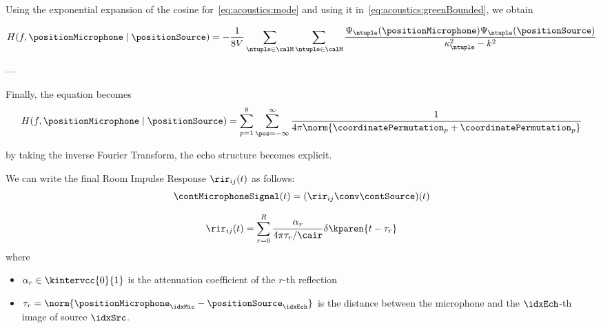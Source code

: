 Using the exponential expansion of the cosine for~\cref{eq:acoustics:mode}
and using it in~\cref{eq:acoustics:greenBounded}, we obtain

\begin{equation}
    H(f, \positionMicrophone \mid \positionSource) =
    - \frac{1}{8 V}
    \sum_{\ntuple \in \calM}
    \sum_{\ntuple \in \calM}
    \frac{\Psi_{\ntuple}(\positionMicrophone)\Psi_{\ntuple}(\positionSource)}{\kappa^2_{\ntuple} - k^2}
\end{equation}%

---

Finally, the equation becomes
\begin{equation}
    \label{eq:acoustics:ims:frourier}
    H(f, \positionMicrophone \mid \positionSource) =
        \sum_{p=1}^{8}
            \sum_{\pos=-\infty}^{\infty}
                \frac{1}{4 \pi \norm{\coordinatePermutation_p +  \coordinatePermutation_p}}
\end{equation}

by taking the inverse Fourier Transform, the echo structure becomes explicit.

We can write the final Room Impulse Response $\rir_{ij}(t)$ as follows:
\begin{equation}
    \contMicrophoneSignal(t) = (\rir_{ij} \conv \contSource)(t)
\end{equation}

\begin{equation}
    \rir_{ij}(t) = \sum_{r=0}^{R} \frac{\alpha_r}{4 \pi \tau_r / \cair} \delta \kparen{t - \tau_r}
\end{equation}
where
\begin{itemize}
    \item $\alpha_r \in \kintervcc{0}{1}$ is the attenuation coefficient of the $r$-th reflection
    \item $\tau_r = \norm{\positionMicrophone_\idxMic - \positionSource_\idxEch}$ is the distance between the microphone and the $\idxEch$-th image of source $\idxSrc$.
\end{itemize}